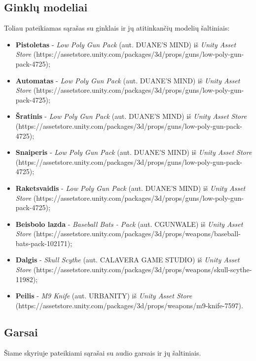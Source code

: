 \documentclass{VUMIFPSkursinis}
\begin{document}
\subsection{Ginklų modeliai}
Toliau pateikiamas sąrašas su ginklais ir jų atitinkančių modelių šaltiniais:
\begin{itemize}
    \item \textbf{Pistoletas} - \textit{Low Poly Gun Pack} (aut. DUANE'S MIND) iš \textit{Unity Asset Store} (https://assetstore.unity.com/packages/3d/props/guns/low-poly-gun-pack-4725);
    \item \textbf{Automatas} - \textit{Low Poly Gun Pack} (aut. DUANE'S MIND) iš \textit{Unity Asset Store} (https://assetstore.unity.com/packages/3d/props/guns/low-poly-gun-pack-4725);
    \item \textbf{Šratinis} - \textit{Low Poly Gun Pack} (aut. DUANE'S MIND) iš \textit{Unity Asset Store} (https://assetstore.unity.com/packages/3d/props/guns/low-poly-gun-pack-4725);
    \item \textbf{Snaiperis} - \textit{Low Poly Gun Pack} (aut. DUANE'S MIND) iš \textit{Unity Asset Store} (https://assetstore.unity.com/packages/3d/props/guns/low-poly-gun-pack-4725);
    \item \textbf{Raketsvaidis} - \textit{Low Poly Gun Pack} (aut. DUANE'S MIND) iš \textit{Unity Asset Store} (https://assetstore.unity.com/packages/3d/props/guns/low-poly-gun-pack-4725);
    \item \textbf{Beisbolo lazda} - \textit{Baseball Bats - Pack} (aut. CGUNWALE) iš  \textit{Unity Asset Store} (https://assetstore.unity.com/packages/3d/props/weapons/baseball-bats-pack-102171);
    \item \textbf{Dalgis} - \textit{Skull Scythe} (aut. CALAVERA GAME STUDIO) iš  \textit{Unity Asset Store} (https://assetstore.unity.com/packages/3d/props/weapons/skull-scythe-11982);
    \item \textbf{Peilis} - \textit{M9 Knife} (aut. URBANITY) iš  \textit{Unity Asset Store} (https://assetstore.unity.com/packages/3d/props/weapons/m9-knife-7597).
\end{itemize}


\subsection{Garsai}
Šiame skyriuje pateikiami sąrašai su audio garsais ir jų šaltiniais.
\end{document}
